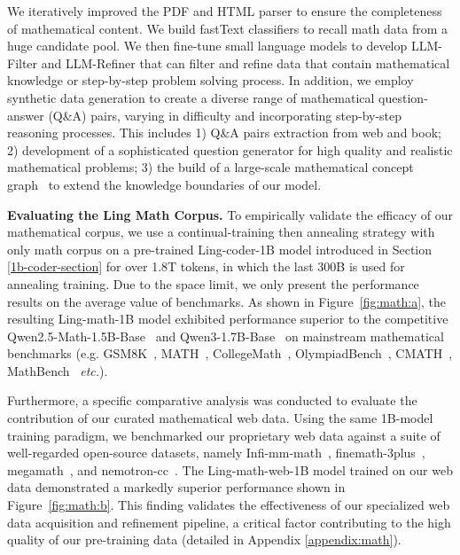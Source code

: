 \documentclass[table]{gtech}
\theoremstyle{definition}
\begin{document}
We iteratively improved the PDF and HTML parser to ensure the completeness of mathematical content. We build fastText classifiers to recall math data from a huge candidate pool. We then fine-tune small language models to develop LLM-Filter and LLM-Refiner that can filter and refine data that contain mathematical knowledge or step-by-step problem solving process.
In addition, we employ synthetic data generation to create a diverse range of mathematical question-answer (Q\&A) pairs, varying in difficulty and incorporating step-by-step reasoning processes. This includes 1) Q\&A pairs extraction from web and book; 2) development of a sophisticated question generator for high quality and realistic mathematical problems; 3) the build of a large-scale mathematical concept graph~\citep{chen2025arrows} to extend the knowledge boundaries of our model.

{\bfseries Evaluating the Ling Math Corpus. }
To empirically validate the efficacy of our mathematical corpus, we use a continual-training then annealing strategy with only math corpus on a pre-trained Ling-coder-1B model introduced in Section \ref{1b-coder-section} for over 1.8T tokens, in which the last 300B is used for annealing training. Due to the space limit, we only present the performance results on the average value of benchmarks. As shown in Figure~\ref{fig:math:a}, the resulting Ling-math-1B model exhibited performance superior to the competitive Qwen2.5-Math-1.5B-Base~\citep{yang2024qwen25mathtechnicalreportmathematical} and Qwen3-1.7B-Base~\citep{qwen3} on mainstream mathematical benchmarks (e.g. GSM8K~\citep{gsm8k}, MATH~\citep{math}, CollegeMath~\citep{college-math}, OlympiadBench~\citep{olympiadbench}, CMATH~\citep{cmath}, MathBench~\citep{mathbench} \emph{etc.}). 

Furthermore, a specific comparative analysis was conducted to evaluate the contribution of our curated mathematical web data. Using the same 1B-model training paradigm, we benchmarked our proprietary web data against a suite of well-regarded open-source datasets, namely Infi-mm-math~\citep{han2024infimmwebmath40badvancingmultimodalpretraining}, finemath-3plus~\citep{allal2025smollm2smolgoesbig}, megamath~\citep{zhou2025megamath}, and nemotron-cc~\citep{mahabadi2025nemotron}. The Ling-math-web-1B model trained on our web data demonstrated a markedly superior performance shown in Figure~\ref{fig:math:b}. This finding validates the effectiveness of our specialized web data acquisition and refinement pipeline, a critical factor contributing to the high quality of our pre-training data (detailed in Appendix \ref{appendix:math}).
\end{document}
